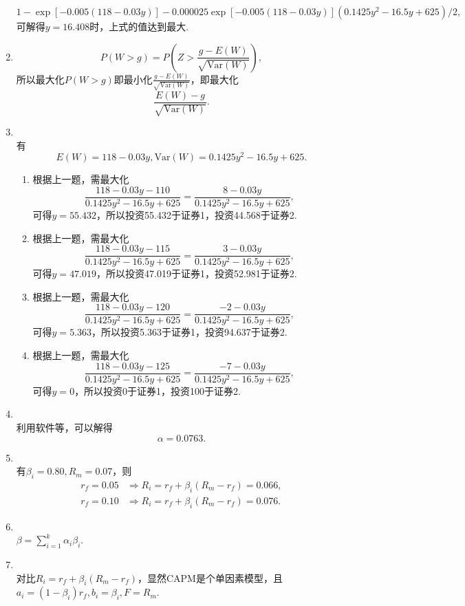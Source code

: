 \begin{enumerate}[label=\arabic{section}.\arabic*]
    \[1-\exp[-0.005(118-0.03y)]-0.000025\exp[-0.005(118-0.03y)](0.1425y^2-16.5y+625)/2,\]
    可解得$y=16.408$时，上式的值达到最大.
    \item \sol
    \[P(W>g)=P\left(Z>\frac{g-E(W)}{\sqrt{\mathrm{Var}(W)}}\right),\]
    所以最大化$P(W>g)$即最小化$\displaystyle \frac{g-E(W)}{\sqrt{\mathrm{Var}(W)}}$，即最大化\[\frac{E(W)-g}{\sqrt{\mathrm{Var}(W)}}.\]
    \item \sol {\kaishu \textcolor{blue}{注意：这里翻译有误，是例9.3b.}}\\
    有
    \[E(W)=118-0.03y,\mathrm{Var}(W)=0.1425y^2-16.5y+625.\]
    \begin{enumerate}[label=\alph*)]
        \item 根据上一题，需最大化
        \[\frac{118-0.03y-110}{0.1425y^2-16.5y+625}=\frac{8-0.03y}{0.1425y^2-16.5y+625},\]
        可得$y=55.432$，所以投资55.432于证券1，投资44.568于证券2.
        \item 根据上一题，需最大化
        \[\frac{118-0.03y-115}{0.1425y^2-16.5y+625}=\frac{3-0.03y}{0.1425y^2-16.5y+625},\]
        可得$y=47.019$，所以投资47.019于证券1，投资52.981于证券2.
        \item 根据上一题，需最大化
        \[\frac{118-0.03y-120}{0.1425y^2-16.5y+625}=\frac{-2-0.03y}{0.1425y^2-16.5y+625},\]
        可得$y=5.363$，所以投资5.363于证券1，投资94.637于证券2.
        \item 根据上一题，需最大化
        \[\frac{118-0.03y-125}{0.1425y^2-16.5y+625}=\frac{-7-0.03y}{0.1425y^2-16.5y+625},\]
        可得$y=0$，所以投资0于证券1，投资100于证券2.
    \end{enumerate}
    \item \sol {\kaishu \textcolor{blue}{注意：这里题干有误，是例9.3d.}}\\
    利用软件等，可以解得\[\alpha=0.0763.\]
    \item \sol\\
    有$\beta_i=0.80,R_m=0.07$，则
    \begin{align*}
        r_f=0.05 & \Rightarrow R_i=r_f+\beta_i(R_m-r_f)=0.066,\\
        r_f=0.10 & \Rightarrow R_i=r_f+\beta_i(R_m-r_f)=0.076.
    \end{align*}
    \item \sol\\ $\displaystyle \beta=\sum\limits_{i=1}^k \alpha_i \beta_i$.
    \item \sol\\ 对比$R_i=r_f+\beta_i(R_m-r_f)$，显然CAPM是个单因素模型，且$a_i=(1-\beta_i)r_f,b_i=\beta_i,F=R_m$.

\end{enumerate}
